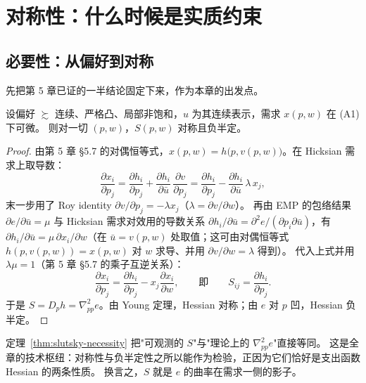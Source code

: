 \section{对称性：什么时候是实质约束}

\subsection{必要性：从偏好到对称}

先把第 5 章已证的一半结论固定下来，作为本章的出发点。

\begin{theorem}\label{thm:slutsky-necessity}
设偏好 $\succsim$ 连续、严格凸、局部非饱和，$u$ 为其连续表示，需求 $x(p,w)$ 在 (A1) 下可微。
则对一切 $(p,w)$，$S(p,w)$ 对称且负半定。
\end{theorem}

\begin{proof}
由第 5 章 \S 5.7 的对偶恒等式，$x(p,w)=h\bigl(p,v(p,w)\bigr)$。在 Hicksian 需求上取导数：
\[
 \frac{\partial x_i}{\partial p_j}
 =\frac{\partial h_i}{\partial p_j}
 +\frac{\partial h_i}{\partial \bar u}\,\frac{\partial v}{\partial p_j}
 =\frac{\partial h_i}{\partial p_j}
 -\frac{\partial h_i}{\partial \bar u}\,\lambda\,x_j,
\]
末一步用了 Roy identity $\partial v/\partial p_j=-\lambda x_j$（$\lambda=\partial v/\partial w$）。
再由 EMP 的包络结果 $\partial e/\partial\bar u=\mu$ 与 Hicksian 需求对效用的导数关系
$\partial h_i/\partial\bar u=\partial^2e/(\partial p_i\partial\bar u)$，有
$\partial h_i/\partial\bar u=\mu\,\partial x_i/\partial w$（在 $\bar u=v(p,w)$ 处取值；这可由对偶恒等式
$h(p,v(p,w))=x(p,w)$ 对 $w$ 求导、并用 $\partial v/\partial w=\lambda$ 得到）。
代入上式并用 $\lambda\mu=1$（第 5 章 \S 5.7 的乘子互逆关系）：
\[
 \frac{\partial x_i}{\partial p_j}=\frac{\partial h_i}{\partial p_j}-x_j\frac{\partial x_i}{\partial w},
 \qquad\text{即}\qquad
 S_{ij}=\frac{\partial h_i}{\partial p_j}.
\]
于是 $S=D_ph=\nabla^2_{pp}e$。由 Young 定理，Hessian 对称；由 $e$ 对 $p$ 凹，Hessian 负半定。
\end{proof}

\begin{remark}[这一步的意义]
定理~\ref{thm:slutsky-necessity} 把"可观测的 $S$"与"理论上的 $\nabla^2_{pp}e$"直接等同。
这是全章的技术枢纽：对称性与负半定性之所以能作为检验，正因为它们恰好是支出函数 Hessian 的两条性质。
换言之，$S$ 就是 $e$ 的曲率在需求一侧的影子。
\end{remark}

